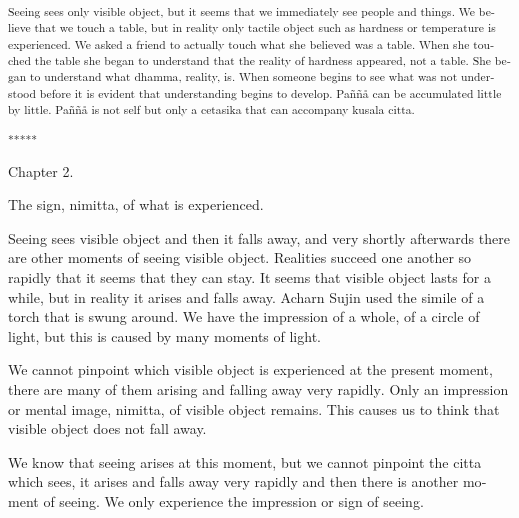 \textsuperscript{\textdutch{Seeing sees only visible object, but it
seems that we immediately see people and things. We believe that we
touch a table, but in reality only tactile object such as hardness or
temperature is experienced. We asked a friend to actually touch what she
believed was a table. When she touched the table she began to understand
that the reality of hardness appeared, not a table. She began to
understand what dhamma, reality, is. When someone begins to see what was
not understood before it is evident that understanding begins to
develop. Paññå can be accumulated little by little. Paññå is not self
but only a cetasika that can accompany kusala citta. }}

\textsuperscript{\textdutch{*****}}

\textsuperscript{}

\textdutch{Chapter 2.}

\textdutch{The sign, nimitta, of what is experienced.}

\textdutch{Seeing sees visible object and then it falls away, and very
shortly afterwards there are other moments of seeing visible object.
Realities succeed one another so rapidly that it seems that they can
stay. }\textenglish[variant=american]{It seems that visible object lasts
for a while, but in reality it arises and}\textdutch{
}\textenglish[variant=american]{falls away. Acharn Sujin used the simile
of a torch that is swung around. We}\textdutch{
}\textenglish[variant=american]{have the impression of a whole, of a
circle of light, but this is caused by}\textdutch{
}\textenglish[variant=american]{many moments of light.}\textdutch{ }

\textenglish[variant=american]{We cannot pinpoint which visible object
is experienced at}\textdutch{ }\textenglish[variant=american]{the
present moment}\textdutch{, there are many of them arising and falling
away very rapidly}. \textdutch{O}\textenglish[variant=american]{nly an
impression or mental image, nimitta, of}\textdutch{ }\textfrench{visible
object}\textdutch{ remains}\textenglish[variant=american]{. This
}\textdutch{causes}\textenglish[variant=american]{ us to think that
visible object does not}\textdutch{ }\textenglish[variant=american]{fall
away.}\textdutch{ }

\textenglish[variant=american]{We know that seeing arises at this
moment, but we cannot pinpoint the }\textdutch{
}\textitalian{citta}\textdutch{ }\textenglish[variant=american]{which
sees, it arises and falls away very rapidly and then there is
another}\textdutch{ }\textenglish[variant=american]{moment of seeing. We
only experience the impression or sign of seeing.}\textdutch{ }

